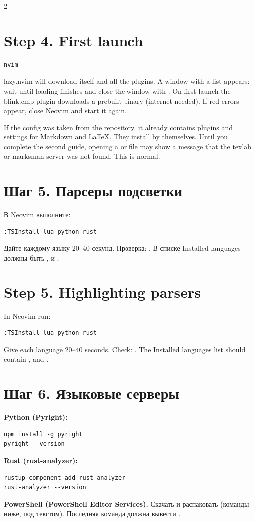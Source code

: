 \begin{paracol}{2}
\section*{Step 4. First launch}
\begin{lstlisting}
nvim
\end{lstlisting}
lazy.nvim will download itself and all the plugins. A window with a list appears: wait until loading finishes and close the window with . On first launch the blink.cmp plugin downloads a prebuilt binary (internet needed). If red errors appear, close Neovim and start it again.

If the config was taken from the repository, it already contains plugins and settings for Markdown and LaTeX. They install by themselves. Until you complete the second guide, opening a  or  file may show a message that the texlab or marksman server was not found. This is normal.
\switchcolumn*

\RU
\section*{Шаг 5. Парсеры подсветки}
В Neovim выполните:
\begin{lstlisting}
:TSInstall lua python rust
\end{lstlisting}
Дайте каждому языку 20--40 секунд. Проверка: . В списке Installed languages должны быть ,  и .
\switchcolumn
\EN
\section*{Step 5. Highlighting parsers}
In Neovim run:
\begin{lstlisting}
:TSInstall lua python rust
\end{lstlisting}
Give each language 20--40 seconds. Check: . The Installed languages list should contain ,  and .
\switchcolumn*

\RU
\section*{Шаг 6. Языковые серверы}
\textbf{Python (Pyright):}
\begin{lstlisting}
npm install -g pyright
pyright --version
\end{lstlisting}
\textbf{Rust (rust-analyzer):}
\begin{lstlisting}
rustup component add rust-analyzer
rust-analyzer --version
\end{lstlisting}
\textbf{PowerShell (PowerShell Editor Services).} Скачать и распаковать (команды ниже, под текстом). Последняя команда должна вывести .
\switchcolumn
\EN

\end{paracol}
